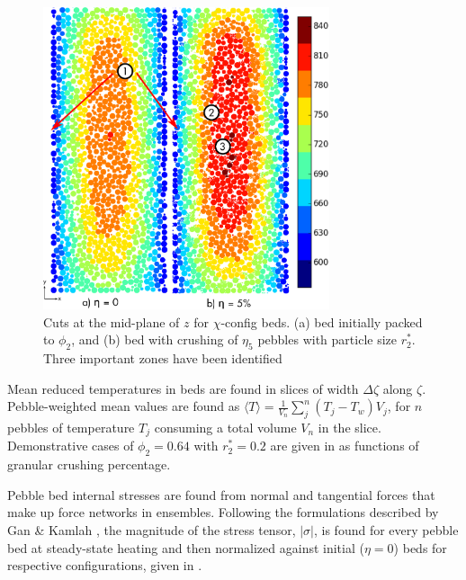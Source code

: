 \begin{figure}[!ht]
    \centering
    \includegraphics[width = 0.75\textwidth]{figures/x-64-discrete.eps}
    \caption{Cuts at the mid-plane of $z$ for $\chi$-config beds. (a) bed initially packed to $\phi_2$, and (b) bed with crushing of $\eta_5$ pebbles with particle size $r_2^*$. Three important zones have been identified}\label{fig:3}
\end{figure}

Mean reduced temperatures in beds are found in slices of width $\Delta\zeta$ along $\zeta$. Pebble-weighted mean values are found as $\langle T\rangle = \frac{1}{V_n}\sum_{j}^n (T_j-T_w) V_j$, for $n$ pebbles of temperature $T_j$ consuming a total volume $V_n$ in the slice. Demonstrative cases of $\phi_2 = 0.64$ with $r_2^* = 0.2$ are given in  as functions of granular crushing percentage.

Pebble bed internal stresses are found from normal and tangential forces that make up force networks in ensembles. Following the formulations described by Gan \& Kamlah \cite{Gan:2010uq}, the magnitude of the stress tensor, $|\sigma|$, is found for every pebble bed at steady-state heating and then normalized against initial ($\eta=0$) beds for respective configurations, given in .%


